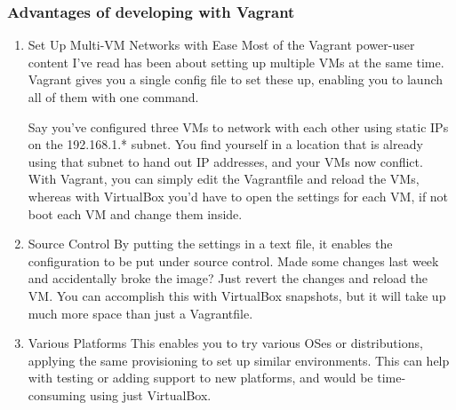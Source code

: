 \documentclass[BTech]{srmuthesis}
\begin{document}
\subsubsection{Advantages of developing with Vagrant}

\begin{enumerate}
    \item Set Up Multi-VM Networks with Ease
Most of the Vagrant power-user content I've read has been about setting up multiple VMs at the same time. Vagrant gives you a single config file to set these up, enabling you to launch all of them with one command.

Say you've configured three VMs to network with each other using static IPs on the 192.168.1.* subnet. You find yourself in a location that is already using that subnet to hand out IP addresses, and your VMs now conflict. With Vagrant, you can simply edit the Vagrantfile and reload the VMs, whereas with VirtualBox you'd have to open the settings for each VM, if not boot each VM and change them inside.

    \item Source Control
By putting the settings in a text file, it enables the configuration to be put under source control. Made some changes last week and accidentally broke the image? Just revert the changes and reload the VM. You can accomplish this with VirtualBox snapshots, but it will take up much more space than just a Vagrantfile.

    \item Various Platforms
This enables you to try various OSes or distributions, applying the same provisioning to set up similar environments. This can help with testing or adding support to new platforms, and would be time-consuming using just VirtualBox.
    
\end{enumerate}



\end{document}
